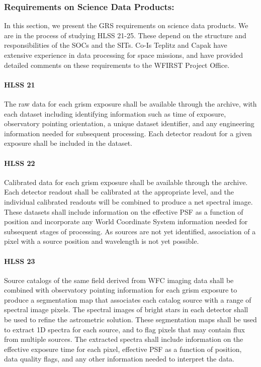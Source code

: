  \subsubsection{Requirements on Science Data Products:} In this section, we present the GRS requirements on science data products. We are in the process of studying HLSS 21-25. These depend on the structure and responsibilities of the SOCs and the SITs. Co-Is Teplitz and Capak have extensive experience in data processing for space missions, and have provided detailed comments on these requirements to the WFIRST Project Office.

\paragraph{HLSS 21} The raw data for each grism exposure shall be available through the
 archive, with each dataset including identifying information such as time of
 exposure, observatory pointing orientation, a unique dataset identifier, and any
 engineering information needed for subsequent processing. Each detector readout
 for a given exposure shall be included in the dataset.

\paragraph{HLSS 22} Calibrated data for each grism exposure shall be available through the archive. Each detector readout shall be calibrated at the appropriate level, and the individual calibrated readouts will be combined to produce a net spectral image. These datasets shall include information on the effective PSF as a
 function of position and incorporate any World Coordinate System information
 needed for subsequent stages of processing. As sources are not yet identified,
 association of a pixel with a source position and wavelength is not yet
 possible.

\paragraph{HLSS 23} Source catalogs of the same field derived from WFC imaging data shall be combined with observatory pointing information for each grism exposure to produce a segmentation map that associates each catalog source with a range of spectral image pixels. The spectral images of bright stars in each detector shall be used to refine the astrometric solution.  These segmentation maps shall be used to extract 1D spectra for each source, and to flag pixels that may contain flux from multiple sources. The extracted spectra shall include
 information on the effective exposure time for each pixel, effective PSF as a
 function of position, data quality flags, and any other information needed to
 interpret the data.

